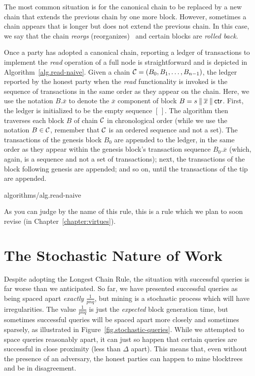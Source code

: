 The most common situation is for the canonical chain to be replaced by a new chain
that extends the previous chain by one more block. However, sometimes a chain appears
that is longer but does not extend the previous chain. In this case, we say that
the chain \emph{reorgs} (reorganizes)~ and certain blocks are \emph{rolled
back}.

Once a party has adopted a canonical chain, reporting a ledger of transactions
to implement the \emph{read} operation of a full node is straightforward and
is depicted in Algorithm~\ref{alg.read-naive}. Given a chain
$\mathcal{C} = (B_0, B_1, \ldots, B_{n-1})$, the ledger reported by the honest
party when the \emph{read} functionality is invoked is the sequence of
transactions in the same order as they appear on the chain.
Here, we use the notation $B.\overline{x}$ to denote the $\overline{x}$ component
of block $B = s \mathbin{\|} \overline{x} \mathbin{\|} \mathsf{ctr}$. 
First, the ledger is initialized to be the empty sequence $[\,]$. The algorithm
then traverses each block $B$ of chain $\mathcal{C}$ in chronological order (while we
use the notation $B \in \mathcal{C}$, remember that $\mathcal{C}$ is an ordered sequence
and not a set). The transactions of the genesis block $B_0$ are appended to the ledger, in the same
order as they appear within the genesis block's transaction sequence $B_0.\overline{x}$
(which, again, is a sequence and not a set of transactions);
next, the transactions of the block following genesis are appended; and so on, until
the transactions of the tip are appended.

{algorithms/alg.read-naive}

As you can judge by the name of this rule, this is a rule which we plan to
soon revise (in Chapter~\ref{chapter:virtues}).

\section{The Stochastic Nature of Work}

Despite adopting the Longest Chain Rule, the situation with successful queries
is far worse than we anticipated.
So far, we have presented successful queries as being
spaced apart \emph{exactly} $\frac{1}{pnq}$, but mining is a stochastic process which will have
irregularities. The value $\frac{1}{pnq}$ is just the \emph{expected} block generation time, but
sometimes successful queries will be spaced apart more closely and sometimes sparsely, as illustrated
in Figure~\ref{fig.stochastic-queries}. While we attempted to space queries reasonably apart, it can
just so happen that certain queries are successful in close proximity (less than $\Delta$ apart).
This means that, even without the presence of an adversary, the honest parties can happen to
mine blocktrees and be in disagreement.

